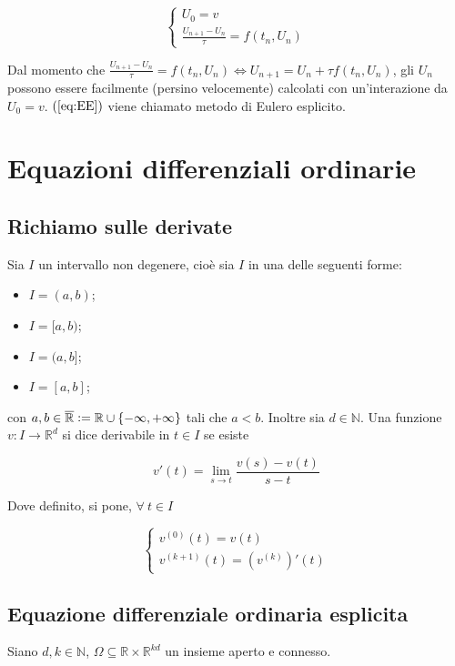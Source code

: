 \documentclass[hidelinks, 10pt]{report}
\begin{document}
\begin{equation}	\label{eq:EE}
\begin{cases}
U_{0} = v \\
\frac{U_{n + 1} - U_{n}}{\tau} = f(t_{n}, U_{n})
\end{cases}
\end{equation}

Dal momento che $ \frac{U_{n + 1} - U_{n}}{\tau} = f(t_{n}, U_{n}) \iff U_{n + 1} = U_{n} + \tau f(t_{n}, U_{n}) $, gli $ U_{n} $ possono essere facilmente (persino velocemente) calcolati con un'interazione da $ U_{0} = v $. $ (\ref{eq:EE}) $ viene chiamato metodo di Eulero esplicito.

\section{Equazioni differenziali ordinarie}
\subsection{Richiamo sulle derivate}
Sia $ I $ un intervallo non degenere, cio\`e sia $ I $ in una delle seguenti forme:
\begin{itemize}
\item $ I = (a, b) $;
\item $ I = [a, b) $;
\item $ I = (a, b] $;
\item $ I = [a, b] $; 
\end{itemize}

con $ a, b \in \overline{\mathbb{R}} \vcentcolon= \mathbb{R} \cup \{ - \infty, + \infty \} $ tali che $ a < b $. Inoltre sia $ d \in \mathbb{N} $. Una funzione $ v: I \to \mathbb{R}^{d} $ si dice derivabile in $ t \in I $ se esiste

\[ v'(t) = \lim\limits_{s \to t} \frac{v(s) - v(t)}{s - t} \]

Dove definito, si pone, $ \forall\ t \in I $

\[
\begin{cases}
v^{(0)}(t) = v(t) \\
v^{(k + 1)}(t) = (v^{(k)})' (t) 
\end{cases}
\]

\subsection{Equazione differenziale ordinaria esplicita}
Siano $ d, k \in \mathbb{N} $, $ \Omega \subseteq \mathbb{R} \times \mathbb{R}^{kd} $ un insieme aperto e connesso.
\end{document}
